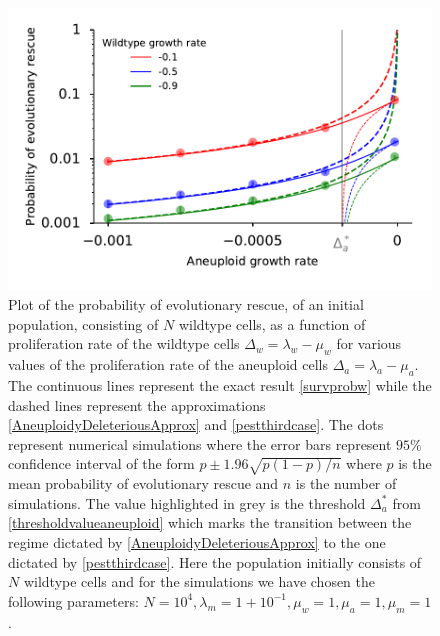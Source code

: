 \documentclass[12pt]{extarticle}
\begin{document}
\begin{figure}[!t]
 \vspace*{1\baselineskip}
\includegraphics[width=1\textwidth]{Figures/P_est_divergence.pdf}
\caption{Plot of the probability of evolutionary rescue, of an initial population, consisting of $N$ wildtype cells, as a function of proliferation rate of the wildtype cells $\Delta_w=\lambda_w-\mu_w$ for various values of the proliferation rate of the aneuploid cells $\Delta_a=\lambda_a-\mu_a$. The continuous lines represent the exact result \eqref{survprobw} while the dashed lines represent the approximations \eqref{AneuploidyDeleteriousApprox} and \eqref{pestthirdcase}. The dots represent numerical simulations where the error bars represent $95\%$ confidence interval of the form $p\pm1.96\sqrt{p\left(1-p\right)/n}$ where $p$ is the mean probability of evolutionary rescue and $n$ is the number of simulations. The value highlighted in grey is the threshold $\Delta_a^*$ from \eqref{thresholdvalueaneuploid} which marks the transition between the regime dictated by \eqref{AneuploidyDeleteriousApprox} to the one dictated by \eqref{pestthirdcase}.  Here the population initially consists of $N$ wildtype cells and for the simulations we have chosen the following parameters: $N=10^4,\lambda_m=1+10^{-1},\mu_w=1,\mu_a=1,\mu_m=1$. }
\label{P_est}
\end{figure}
\end{document}
